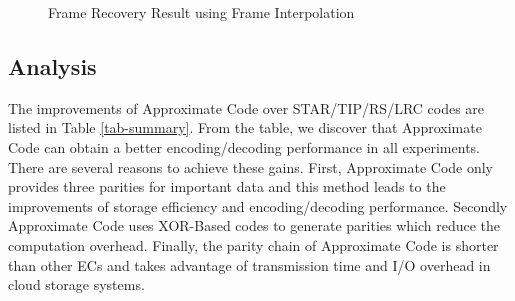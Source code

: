 \documentclass[sigconf]{acmart}
\begin{document}
\begin{figure}[ht]
\centering
{}

\caption{Frame Recovery Result using Frame Interpolation}
\label{fig-frameRecovery}
\end{figure}

\subsection{Analysis}
The improvements of Approximate Code over STAR/TIP/RS/LRC codes are listed in Table \ref{tab-summary}. From the table, we discover that Approximate Code can obtain a better encoding/decoding performance in all experiments. There are several reasons to achieve these gains. First, Approximate Code only provides three parities for important data and this method leads to the improvements of storage efficiency and encoding/decoding performance. Secondly Approximate Code uses XOR-Based codes to generate parities which reduce the computation overhead. Finally, the parity chain of Approximate Code is shorter than other ECs and takes advantage of transmission time and I/O overhead in cloud storage systems.
\end{document}
